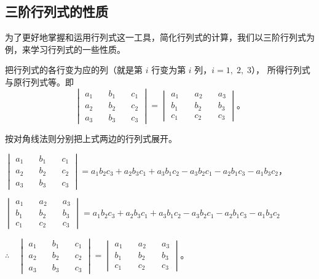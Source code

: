 \subsection{三阶行列式的性质}\label{subsec:4-3}

为了更好地掌握和运用行列式这一工具，简化行列式的计算，我们以三阶行列式为例，来学习行列式的一些性质。

\begin{theorem} \label{theorem:sjhls-1}
    把行列式的各行变为应的列（就是第 $i$ 行变为第 $i$ 列，$i = 1,\; 2,\; 3$）， 所得行列式与原行列式等。即
    $$
    \begin{vmatrix*}
        a_1 \quad & b_1 \quad & c_1 \\
        a_2 \quad & b_2 \quad & c_2 \\
        a_3 \quad & b_3 \quad & c_3
    \end{vmatrix*}
    =
    \begin{vmatrix*}
        a_1 \quad & a_2 \quad & a_3 \\
        b_1 \quad & b_2 \quad & b_3 \\
        c_1 \quad & c_2 \quad & c_3
    \end{vmatrix*} \text{。}
    $$
\end{theorem}


\zhengming 按对角线法则分别把上式两边的行列式展开。

$\begin{vmatrix*}
    a_1 \quad & b_1 \quad & c_1 \\
    a_2 \quad & b_2 \quad & c_2 \\
    a_3 \quad & b_3 \quad & c_3
\end{vmatrix*} = a_1b_2c_3 + a_2b_3c_1 + a_3b_1c_2 - a_3b_2c_1 - a_2b_1c_3 - a_1b_3c_2$，

$\begin{vmatrix*}
    a_1 \quad & a_2 \quad & a_3 \\
    b_1 \quad & b_2 \quad & b_3 \\
    c_1 \quad & c_2 \quad & c_3
\end{vmatrix*} = a_1b_2c_3 + a_2b_3c_1 + a_3b_1c_2 - a_3b_2c_1 - a_2b_1c_3 - a_1b_3c_2$

$\therefore \quad
\begin{vmatrix*}
    a_1 \quad & b_1 \quad & c_1 \\
    a_2 \quad & b_2 \quad & c_2 \\
    a_3 \quad & b_3 \quad & c_3
\end{vmatrix*}
=
\begin{vmatrix*}
    a_1 \quad & a_2 \quad & a_3 \\
    b_1 \quad & b_2 \quad & b_3 \\
    c_1 \quad & c_2 \quad & c_3
\end{vmatrix*} \text{。}$


